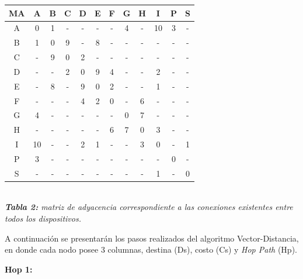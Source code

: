 \documentclass[letterpaper,10pt,onecolumn,titlepage]{article}
\begin{document}
\begin{center}
   \begin{tabular}{|c|c|c|c|c|c|c|c|c|c|c|c|} \hline
     MA & A  & B & C & D & E & F & G & H & I  & P & S \\ \hline
     A  & 0  & 1 & - & - & - & - & 4 & - & 10 & 3 & - \\ \hline
     B  & 1  & 0 & 9 & - & 8 & - & - & - & -  & - & - \\ \hline
     C  & -  & 9 & 0 & 2 & - & - & - & - & -  & - & - \\ \hline
     D  & -  & - & 2 & 0 & 9 & 4 & - & - & 2  & - & - \\ \hline
     E  & -  & 8 & - & 9 & 0 & 2 & - & - & 1  & - & - \\ \hline
     F  & -  & - & - & 4 & 2 & 0 & - & 6 & -  & - & - \\ \hline
     G  & 4  & - & - & - & - & - & 0 & 7 & -  & - & - \\ \hline
     H  & -  & - & - & - & - & 6 & 7 & 0 & 3  & - & - \\ \hline
     I  & 10 & - & - & 2 & 1 & - & - & 3 & 0  & - & 1 \\ \hline
     P  & 3  & - & - & - & - & - & - & - & -  & 0 & - \\ \hline
     S  & -  & - & - & - & - & - & - & - & 1  & - & 0 \\ \hline
   \end{tabular}\\
   \textit{\textbf{Tabla 2:} matriz de adyacencia correspondiente a las conexiones existentes entre todos los dispositivos.}
 \end{center}

A continuación se presentarán los pasos realizados del algoritmo Vector-Distancia, en donde cada nodo posee 3 columnas, destina (Ds), costo (Cs) y \textit{Hop Path} (Hp).

\textbf{Hop 1:}
\end{document}
